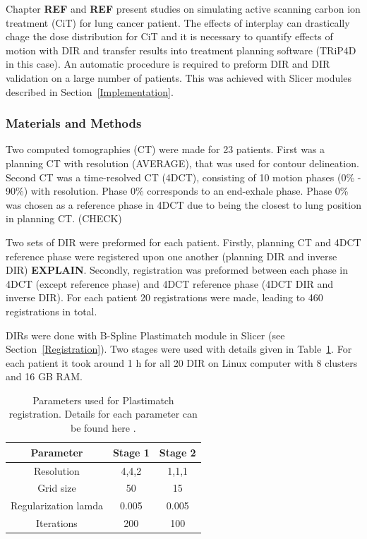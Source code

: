 \documentclass[type=dr, dr=rernat, accentcolor=tud7b,colorbacktitle, bigchapter, openright, twoside, 12pt ]{tudthesis}
\begin{document}
Chapter \textbf{REF} and \textbf{REF} present studies on simulating active scanning carbon ion treatment (CiT) for lung cancer patient. The effects of interplay can drastically chage the dose distribution for CiT and it is necessary to quantify effects of motion with DIR and transfer results into
treatment planning software (TRiP4D in this case). An automatic procedure is required to preform DIR and DIR validation on a large number of patients. This was achieved with Slicer modules described in Section~\ref{Implementation}.

\subsubsection{Materials and Methods}

Two computed tomographies (CT) were made for 23 patients. First was a planning CT with resolution (AVERAGE), that was used for contour delineation. Second CT was a time-resolved CT (4DCT), consisting of 10 motion phases (0\% - 90\%) with resolution.
Phase 0\% corresponds to an end-exhale phase. Phase 0\% was chosen as a reference phase in 4DCT due to being the closest to lung position in planning CT. (CHECK)

Two sets of DIR were preformed for each patient. Firstly, planning CT and 4DCT reference phase were registered upon one another (planning DIR and inverse DIR) \textbf{EXPLAIN}. Secondly, registration was preformed between each phase in 4DCT
(except reference phase) and 4DCT reference phase (4DCT DIR and inverse DIR). For each patient 20 registrations were made, leading to 460 registrations in total.

DIRs were done with B-Spline Plastimatch module in Slicer (see Section~\ref{Registration}). Two stages were used with details given in Table~\ref{tab:stages}. For each patient it took around 1 h for all 20 DIR on Linux computer with 8 clusters and 16 GB RAM.

\begin{table}[H]
  \centering
  \caption{Parameters used for Plastimatch registration. Details for each parameter can be found here \cite{Plastimatch}.}
  \begin{tabular}{c|c|c}
      Parameter & Stage 1 & Stage 2 \\
      \hline
      Resolution & 4,4,2 & 1,1,1 \\
      Grid size & 50 & 15 \\
      Regularization lamda & 0.005 & 0.005 \\
      Iterations & 200 & 100 \\
    \hline\hline
  \end{tabular}
  \label{tab:stages}
\end{table}
\end{document}
